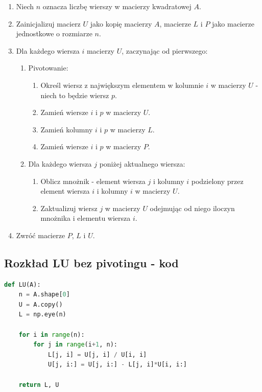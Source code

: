 \documentclass[a4paper]{article}
\begin{document}
\begin{enumerate}
    \item Niech \(n\) oznacza liczbę wierszy w macierzy kwadratowej \(A\).
    \item Zainicjalizuj macierz \(U\) jako kopię macierzy \(A\), macierze \(L\) i \(P\) jako macierze jednostkowe o rozmiarze \(n\).
    \item Dla każdego wiersza \(i\) macierzy \(U\), zaczynając od pierwszego:
    \begin{enumerate}
        \item Pivotowanie:
        \begin{enumerate}
            \item Określ wiersz z największym elementem w kolumnie \(i\) w macierzy \(U\) - niech to będzie wiersz \(p\).
            \item Zamień wiersze \(i\) i \(p\) w macierzy \(U\).
            \item Zamień kolumny \(i\) i \(p\) w macierzy \(L\).
            \item Zamień wiersze \(i\) i \(p\) w macierzy \(P\).
        \end{enumerate}
        \item Dla każdego wiersza \(j\) poniżej aktualnego wiersza:
        \begin{enumerate}
            \item Oblicz mnożnik - element wiersza \(j\) i kolumny \(i\) podzielony przez element wiersza \(i\) i kolumny \(i\) w macierzy \(U\).
            \item Zaktualizuj wiersz \(j\) w macierzy \(U\) odejmując od niego iloczyn mnożnika i elementu wiersza \(i\).
        \end{enumerate}
    \end{enumerate}
    \item Zwróć macierze \(P\), \(L\) i \(U\).
\end{enumerate}

\subsection{Rozkład LU bez pivotingu - kod}
\begin{lstlisting}[language=python]
def LU(A):
    n = A.shape[0]
    U = A.copy()
    L = np.eye(n)

    for i in range(n):
        for j in range(i+1, n):
            L[j, i] = U[j, i] / U[i, i]
            U[j, i:] = U[j, i:] - L[j, i]*U[i, i:]

    return L, U

\end{lstlisting}
\end{document}
